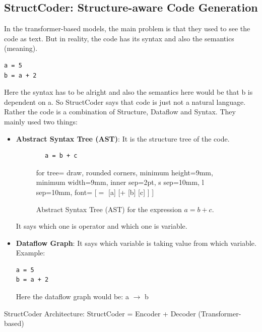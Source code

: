 \documentclass[12pt]{article}
\begin{document}
\subsection{StructCoder: Structure-aware Code Generation}
In the transformer-based models, the main problem is that they used to see the code as text. But in reality, the code has its syntax and also the semantics (meaning).
\begin{lstlisting}
a = 5
b = a + 2
\end{lstlisting}
Here the syntax has to be alright and also the semantics here would be that b is dependent on a. So StructCoder says that code is just not a natural language. Rather the code is a combination of Structure, Dataflow and Syntax. They mainly used two things:
\begin{itemize}
	\item \textbf{Abstract Syntax Tree (AST)}: It is the structure tree of the code.
	\begin{lstlisting}
		a = b + c
	\end{lstlisting}
	\begin{figure}[H]
	\centering
	\begin{forest}
	for tree={
		draw,
		rounded corners,
		minimum height=9mm,
		minimum width=9mm,
		inner sep=2pt,
		s sep=10mm,
		l sep=10mm,
		font=\ttfamily\bfseries
	}
	[{$=$}
		[a]
		[+
			[b]
			[c]
		]
	]
	\end{forest}
		\caption{Abstract Syntax Tree (AST) for the expression $a = b + c$.}\label{fig:ast_tree}
		\end{figure}
	It says which one is operator and which one is variable.
	
	\item \textbf{Dataflow Graph}: 
	It says which variable is taking value from which variable. Example:
	\begin{lstlisting}
a = 5
b = a + 2
	\end{lstlisting}
Here the dataflow graph would be:
a $\rightarrow$ b
\end{itemize}
StructCoder Architecture:
StructCoder = Encoder + Decoder (Transformer-based)
\end{document}
